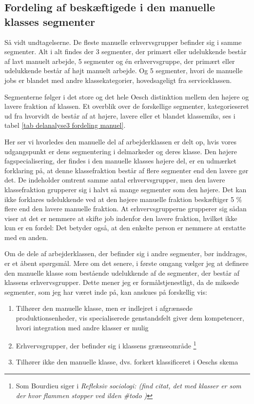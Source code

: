%
\subsection{Fordeling af beskæftigede i den manuelle klasses segmenter}
%



Så vidt undtagelserne. De fleste manuelle erhvervsgrupper befinder sig i samme segmenter. Alt i alt findes der 3 segmenter, der primært eller udelukkende består af lavt manuelt arbejde, 5 segmenter og én erhvervsgruppe, der primært eller udelukkende består af højt manuelt arbejde. Og 5 segmenter, hvori de manuelle jobs er blandet med andre klassekategorier, hovedsageligt fra serviceklassen. 

Segmenterne følger i det store og det hele Oesch distinktion mellem den højere og lavere fraktion af klassen. Et overblik over de forskellige segmenter, kategorieseret ud fra hvorvidt de består af at højere, lavere eller et blandet klassemiks, ses i tabel \ref{tab delanalyse3 fordeling manuel}.

    
 
Her ser vi hvorledes den manuelle del af arbejderklassen er delt op, hvis vores udgangspunkt er dens segmentering i delmarkeder og deres klasse. Den højere fagspecialisering, der findes i den manuelle klasses højere del, er en udmærket forklaring på, at denne klassefraktion består af flere segmenter end den lavere gør det. De indeholder omtrent samme antal erhvervsgrupper, men den lavere klassefraktion grupperer sig i halvt så mange segmenter som den højere. Det kan ikke forklares udelukkende ved at den højere manuelle fraktion beskæftiger 5 \% flere end den lavere manuelle fraktion. At erhvervsgrupperne grupperer sig sådan viser at det er nemmere at skifte job indenfor den lavere fraktion, hvilket ikke kun er en fordel: Det betyder også, at den enkelte person er nemmere at erstatte med en anden. 



Om de dele af arbejderklassen, der befinder sig i andre segmenter, bør inddrages, er et åbent spørgsmål. Mere om det senere, i første omgang vælger jeg at definere den manuelle klasse som bestående udelukkende af de segmenter, der består af klassens erhvervsgrupper. Dette mener jeg er formålstjenestligt, da de miksede segmenter, som jeg har været inde på, kan anskues på forskellig vis:

%
\begin{enumerate}
 \itemsep -0.5em
   \item Tilhører den manuelle klasse, men er indlejret i afgrænsede produktionsenheder, vis specialiserede genstandsfelt giver dem kompetencer, hvori integration med andre klasser er mulig  
   \item Erhvervsgrupper, der befinder sig i klassens grænseområde%
       \footnote{ Som Bourdieu siger i \emph{Refleksiv sociologi: (find citat, det med klasser er som der hvor flammen stopper ved ilden \#todo )}}%
   \item Tilhører ikke den manuelle klasse, dvs. forkert klassificeret i Oeschs skema
\end{enumerate}
%

